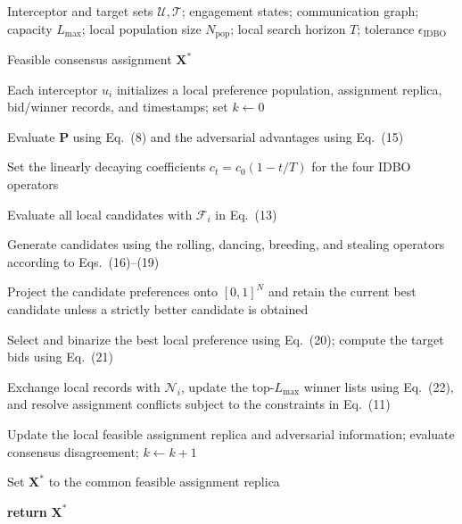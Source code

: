 \documentclass[11pt]{article}
\begin{document}
\begin{tcolorbox}[enhanced,breakable,colback=white,colframe=addblue!55,
boxrule=0.6pt,arc=2pt,left=9pt,right=9pt,top=7pt,bottom=7pt]
\begin{algorithm}[H]
\color{addblue}
\fontsize{9pt}{11.0476pt}\selectfont
{}
\caption{IDBO Target Assignment}
\begin{algorithmic}[1]
\REQUIRE Interceptor and target sets $\mathcal{U},\mathcal{T}$;
engagement states; communication graph; capacity $L_{\max}$;
local population size $N_{\mathrm{pop}}$; local search horizon $T$;
tolerance $\epsilon_{\mathrm{IDBO}}$

\ENSURE Feasible consensus assignment $\mathbf{X}^{\ast}$

\STATE Each interceptor $u_i$ initializes a local preference population,
assignment replica, bid/winner records, and timestamps;
set $k\!\leftarrow\!0$

\REPEAT

  \STATE Evaluate $\mathbf{P}$ using Eq.~(8) and the adversarial
  advantages using Eq.~(15)


    \STATE Set the linearly decaying coefficients
    $c_t=c_0(1-t/T)$ for the four IDBO operators

    \STATE Evaluate all local candidates with
    $\mathcal{F}_i$ in Eq.~(13)

    \STATE Generate candidates using the rolling, dancing, breeding,
    and stealing operators according to Eqs.~(16)--(19)

    \STATE Project the candidate preferences onto $[0,1]^N$ and retain
    the current best candidate unless a strictly better candidate is
    obtained

  \ENDFOR

  \STATE Select and binarize the best local preference using Eq.~(20);
  compute the target bids using Eq.~(21)

  \STATE Exchange local records with $\mathcal{N}_i$, update the
  top-$L_{\max}$ winner lists using Eq.~(22), and resolve assignment
  conflicts subject to the constraints in Eq.~(11)

  \STATE Update the local feasible assignment replica and adversarial
  information; evaluate consensus disagreement;
  $k\!\leftarrow\!k+1$


\STATE Set $\mathbf{X}^{\ast}$ to the common feasible assignment replica

\STATE \textbf{return} $\mathbf{X}^{\ast}$

\end{algorithmic}
\end{algorithm}
\end{tcolorbox}
\end{document}
